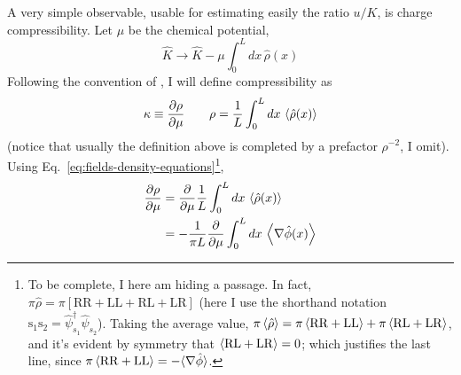 A very simple observable, usable for estimating easily the ratio $u/K$, is charge compressibility. Let $\mu$ be the chemical potential,
\[
	\hat K \to \hat K - \mu \int_0^L dx \, \hat \rho(x)
\]
Following the convention of \citeauthor{giamarchi2003quantum}, I will define compressibility as
\[
	\kappa \equiv \pdv{\rho}{\mu}
	\qquad
	\rho = \frac{1}{L} \int_0^L dx \, \ev{\hat \rho(x)}
\]
(notice that usually the definition above is completed by a prefactor $\rho^{-2}$, I omit). Using Eq.~\eqref{eq:fields-density-equations}\footnote{
	To be complete, I here am hiding a passage. In fact, $\pi \hat \rho = \pi \left[ \mathrm{RR} + \mathrm{LL} + \mathrm{RL} + \mathrm{LR} \right]$ (here I use the shorthand notation $\mathrm{s}_1 \mathrm{s}_2 = \hat \psi_{s_1}^\dagger \hat \psi_{s_2}$). Taking the average value, $\pi \ev{\hat \rho} = \pi \ev{ \mathrm{RR} + \mathrm{LL}} + \pi \ev{\mathrm{RL} + \mathrm{LR}}$, and it's evident by symmetry that $\ev{\mathrm{RL} + \mathrm{LR}} = 0$; which justifies the last line, since $\pi \ev{ \mathrm{RR} + \mathrm{LL}} = - \langle \nabla \hat \phi \rangle$.
},
\[
\begin{aligned}
	\pdv{\rho}{\mu} &= \pdv{}{\mu} \frac{1}{L} \int_0^L dx \, \ev{\hat \rho(x)} \\
	&= - \frac{1}{\pi L} \pdv{}{\mu} \int_0^L dx \, \ev{\nabla \hat \phi(x)}
\end{aligned}
\]

